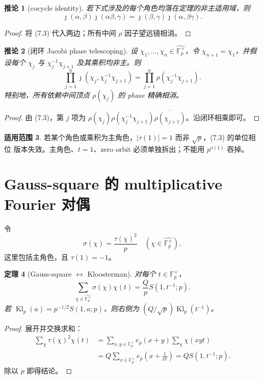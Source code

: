 \documentclass[11pt,a4paper]{ctexart}
\newtheorem{theorem}{定理}[section]
\newtheorem{corollary}[theorem]{推论}
\theoremstyle{definition}
\newtheorem{remark}[theorem]{适用范围}
\newcommand{\F}{\mathbb F}
\newcommand{\G}{\F_p^\times}
\newcommand{\Gh}{\widehat{\G}}
\newcommand{\ep}{e_p}
\newcommand{\1}{\mathbf 1}
\newcommand{\Kl}{\operatorname{Kl}}
\begin{document}
\begin{corollary}[cocycle identity]
若下式涉及的每个角色均落在定理的非主适用域，则
\[
\boxed{
\jmath(\alpha,\beta)\jmath(\alpha\beta,\gamma)
=\jmath(\beta,\gamma)\jmath(\alpha,\beta\gamma).}
\tag{7.4}
\]
\end{corollary}

\begin{proof}
将 (7.3) 代入两边；所有中间 $\rho$ 因子望远镜相消。
\end{proof}

\begin{corollary}[闭环 Jacobi phase telescoping]
设 $\chi_1,\ldots,\chi_n\in\Gh$，令 $\chi_{n+1}=\chi_1$，并假设每个
$\chi_j$ 与 $\chi_j^{-1}\chi_{j+1}$ 及其乘积均非主。则
\[
\prod_{j=1}^n
\jmath(\chi_j,\chi_j^{-1}\chi_{j+1})
=\prod_{j=1}^n\rho(\chi_j^{-1}\chi_{j+1}).
\tag{7.5}
\]
特别地，所有依赖中间顶点 $\rho(\chi_j)$ 的 phase 精确相消。
\end{corollary}

\begin{proof}
由 (7.3)，第 $j$ 项为
$\rho(\chi_j)\rho(\chi_j^{-1}\chi_{j+1})
\overline{\rho(\chi_{j+1})}$。沿闭环相乘即可。
\end{proof}

\begin{remark}
若某个角色或乘积为主角色，$|\tau(1)|=1$ 而非 $\sqrt p$，(7.3) 的单位相位
版本失效。主角色、$t=1$、zero orbit 必须单独拆出；不能用 $p^{o(1)}$ 吞掉。
\end{remark}

\section{Gauss-square 的 multiplicative Fourier 对偶}

令
\[
\sigma(\chi)=\frac{\tau(\chi)^2}{p}
\quad(\chi\in\Gh),
\tag{8.1}
\]
这里包括主角色，且 $\tau(1)=-1$。

\begin{theorem}[Gauss-square $\leftrightarrow$ Kloosterman]
对每个 $t\in\G$，
\[
\boxed{
\sum_{\chi\in\Gh}\sigma(\chi)\chi(t)
=\frac Qp S(1,t^{-1};p).}
\tag{8.2}
\]
若 $\Kl_p(a)=p^{-1/2}S(1,a;p)$，则右侧为
\((Q/\sqrt p)\Kl_p(t^{-1})\)。
\end{theorem}

\begin{proof}
展开并交换求和：
\begin{align*}
\sum_\chi\tau(\chi)^2\chi(t)
&=\sum_{x,y\in\G}\ep(x+y)
\sum_\chi\chi(xyt)\\
&=Q\sum_{x\in\G}\ep\!\left(x+\frac1{xt}\right)
=Q S(1,t^{-1};p).
\end{align*}
除以 $p$ 即得结论。
\end{proof}
\end{document}

